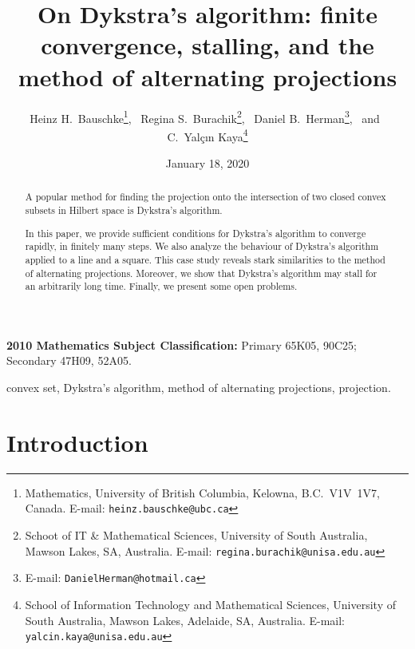 \documentclass[12pt]{article}
\begin{document}



\title{ \textsc
On Dykstra's algorithm: finite convergence, stalling, 
and the method of alternating projections
}

\author{
Heinz H.\ Bauschke\thanks{
Mathematics, University
of British Columbia,
Kelowna, B.C.\ V1V~1V7, Canada. E-mail:
\texttt{heinz.bauschke@ubc.ca}},~
Regina S.\ Burachik\thanks{
Schoot of IT \& Mathematical Sciences, 
University of South Australia, 
Mawson Lakes, SA, Australia. 
 E-mail: \texttt{regina.burachik@unisa.edu.au}
},~
Daniel B.\ Herman\thanks{E-mail: \texttt{DanielHerman@hotmail.ca}},
~and~
C.\ Yal\c{c}{\i}n Kaya\thanks{
School of Information Technology and Mathematical Sciences, 
University of South Australia, 
Mawson Lakes, Adelaide, SA, Australia.
 E-mail: \texttt{yalcin.kaya@unisa.edu.au}}
}

\date{January 18, 2020}


\maketitle



\begin{abstract}
A popular method for finding the projection onto the intersection 
of two closed convex subsets in Hilbert space is Dykstra's algorithm. 

In this paper, we provide sufficient conditions for Dykstra's algorithm 
to converge rapidly, in finitely many steps. 
We also analyze the behaviour of Dykstra's algorithm 
applied to a line and a square. 
This case study reveals stark similarities to the method of alternating 
projections. Moreover, we show that Dykstra's algorithm 
may stall for an arbitrarily long time. 
Finally, we present some open problems. 
\end{abstract}
{ 
\noindent
{\bfseries 2010 Mathematics Subject Classification:}
{Primary 
65K05, 
90C25;
Secondary 
47H09,
52A05.
}

 
convex set, 
Dykstra's algorithm,
method of alternating projections,
projection.
}

\section{Introduction}
\end{document}
